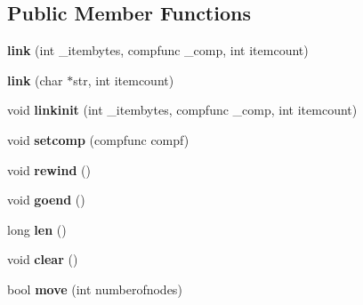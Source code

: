 \subsection*{Public Member Functions}
\begin{DoxyCompactItemize}
\item 
\mbox{\label{classStemMesh3D_1_1tetgenmesh_1_1link_a648d48615747a221bb63c57665576cf9}} 
{\bfseries link} (int \+\_\+itembytes, compfunc \+\_\+comp, int itemcount)
\item 
\mbox{\label{classStemMesh3D_1_1tetgenmesh_1_1link_a7297877a8b5aa71b367fe626e9c3edef}} 
{\bfseries link} (char $\ast$str, int itemcount)
\item 
\mbox{\label{classStemMesh3D_1_1tetgenmesh_1_1link_aeb16a9c9e31951fb584330f0c842d80f}} 
void {\bfseries linkinit} (int \+\_\+itembytes, compfunc \+\_\+comp, int itemcount)
\item 
\mbox{\label{classStemMesh3D_1_1tetgenmesh_1_1link_ad056d6320b70755e688dccc0973a20d6}} 
void {\bfseries setcomp} (compfunc compf)
\item 
\mbox{\label{classStemMesh3D_1_1tetgenmesh_1_1link_a0967a0ff7d437351e3464a5f970f6e6c}} 
void {\bfseries rewind} ()
\item 
\mbox{\label{classStemMesh3D_1_1tetgenmesh_1_1link_ab0de3f0050a46c714526cb6c89452d23}} 
void {\bfseries goend} ()
\item 
\mbox{\label{classStemMesh3D_1_1tetgenmesh_1_1link_a4a3f67cb1a170ad1e81168f68bac3c23}} 
long {\bfseries len} ()
\item 
\mbox{\label{classStemMesh3D_1_1tetgenmesh_1_1link_acb4400f07e0ca6053581eda225b4d316}} 
void {\bfseries clear} ()
\item 
\mbox{\label{classStemMesh3D_1_1tetgenmesh_1_1link_a649ad8523261dc9aa64f7e9d3e04b3f6}} 
bool {\bfseries move} (int numberofnodes)

\end{DoxyCompactItemize}
